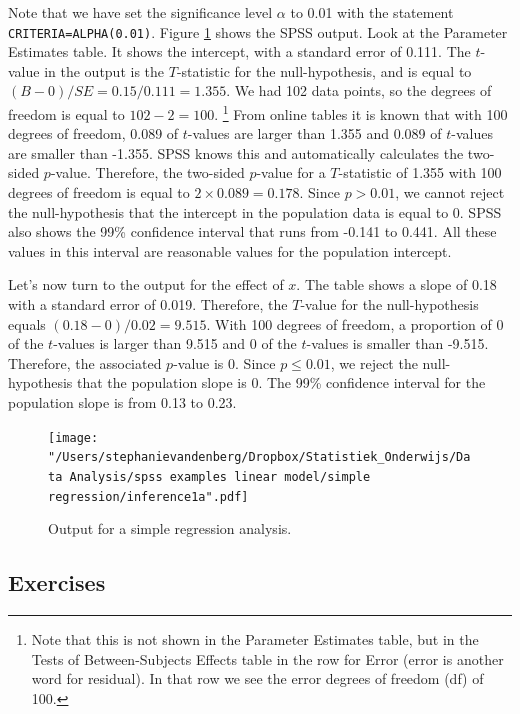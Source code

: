 \documentclass[]{book}\usepackage[]{graphicx}\usepackage[]{color}
\begin{document}
Note that we have set the significance level $\alpha$ to 0.01 with the statement \texttt{CRITERIA=ALPHA(0.01)}. Figure \ref{fig:inf_29} shows the SPSS output. Look at the Parameter Estimates table. It shows the intercept, with a standard error of 0.111. The $t$-value in the output is the $T$-statistic for the null-hypothesis, and is equal to $(B-0)/SE=0.15/0.111=1.355$. We had 102 data points, so the degrees of freedom is equal to $102-2=100$. \footnote{Note that this is not shown in the Parameter Estimates table, but in the Tests of Between-Subjects Effects table in the row for Error (error is another word for residual). In that row we see the error degrees of freedom (df) of 100.} From online tables it is known that with 100 degrees of freedom, 0.089 of $t$-values are larger than 1.355 and 0.089 of $t$-values are smaller than -1.355. SPSS knows this and automatically calculates the two-sided $p$-value. Therefore, the two-sided $p$-value for a $T$-statistic of 1.355 with 100 degrees of freedom is equal to $2 \times 0.089 = 0.178$. Since $p > 0.01$, we cannot reject the null-hypothesis that the intercept in the population data is equal to 0. SPSS also shows the 99\% confidence interval that runs from -0.141 to 0.441. All these values in this interval are reasonable values for the population intercept.

Let's now turn to the output for the effect of $x$. The table shows a slope of 0.18 with a standard error of 0.019. Therefore, the $T$-value for the null-hypothesis equals $(0.18-0)/0.02=9.515$. With 100 degrees of freedom, a proportion of 0 of the $t$-values is larger than 9.515 and 0 of the $t$-values is smaller than -9.515. Therefore, the associated $p$-value is 0. Since $p \leq 0.01$, we reject the null-hypothesis that the population slope is 0. The 99\% confidence interval for the population slope is from 0.13 to 0.23.

\begin{figure}[h!]
    \begin{center}
       \texttt{[image: "/Users/stephanievandenberg/Dropbox/Statistiek\_Onderwijs/Data Analysis/spss examples linear model/simple regression/inference1a".pdf]}
    \end{center}
    \caption{Output for a simple regression analysis.}
    \label{fig:inf_29}
\end{figure}


\subsection{Exercises}
\end{document}
